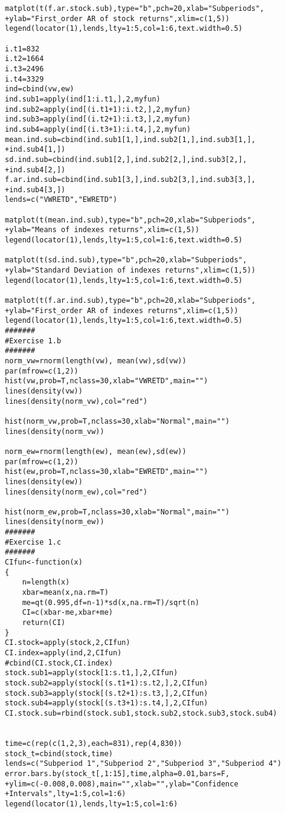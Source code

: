 \begin{small}
\begin{lstlisting}
matplot(t(f.ar.stock.sub),type="b",pch=20,xlab="Subperiods",
+ylab="First_order AR of stock returns",xlim=c(1,5))
legend(locator(1),lends,lty=1:5,col=1:6,text.width=0.5)

i.t1=832
i.t2=1664
i.t3=2496
i.t4=3329
ind=cbind(vw,ew)
ind.sub1=apply(ind[1:i.t1,],2,myfun)
ind.sub2=apply(ind[(i.t1+1):i.t2,],2,myfun)
ind.sub3=apply(ind[(i.t2+1):i.t3,],2,myfun)
ind.sub4=apply(ind[(i.t3+1):i.t4,],2,myfun)
mean.ind.sub=cbind(ind.sub1[1,],ind.sub2[1,],ind.sub3[1,],
+ind.sub4[1,])
sd.ind.sub=cbind(ind.sub1[2,],ind.sub2[2,],ind.sub3[2,],
+ind.sub4[2,])
f.ar.ind.sub=cbind(ind.sub1[3,],ind.sub2[3,],ind.sub3[3,],
+ind.sub4[3,])
lends=c("VWRETD","EWRETD")

matplot(t(mean.ind.sub),type="b",pch=20,xlab="Subperiods",
+ylab="Means of indexes returns",xlim=c(1,5))
legend(locator(1),lends,lty=1:5,col=1:6,text.width=0.5)

matplot(t(sd.ind.sub),type="b",pch=20,xlab="Subperiods",
+ylab="Standard Deviation of indexes returns",xlim=c(1,5))
legend(locator(1),lends,lty=1:5,col=1:6,text.width=0.5)

matplot(t(f.ar.ind.sub),type="b",pch=20,xlab="Subperiods",
+ylab="First_order AR of indexes returns",xlim=c(1,5))
legend(locator(1),lends,lty=1:5,col=1:6,text.width=0.5)
#######
#Exercise 1.b
#######
norm_vw=rnorm(length(vw), mean(vw),sd(vw))
par(mfrow=c(1,2))
hist(vw,prob=T,nclass=30,xlab="VWRETD",main="")
lines(density(vw))
lines(density(norm_vw),col="red")

hist(norm_vw,prob=T,nclass=30,xlab="Normal",main="")
lines(density(norm_vw))

norm_ew=rnorm(length(ew), mean(ew),sd(ew))
par(mfrow=c(1,2))
hist(ew,prob=T,nclass=30,xlab="EWRETD",main="")
lines(density(ew))
lines(density(norm_ew),col="red")

hist(norm_ew,prob=T,nclass=30,xlab="Normal",main="")
lines(density(norm_ew))
#######
#Exercise 1.c
#######
CIfun<-function(x)
{
	n=length(x)
	xbar=mean(x,na.rm=T)
	me=qt(0.995,df=n-1)*sd(x,na.rm=T)/sqrt(n)
	CI=c(xbar-me,xbar+me)
	return(CI)
}
CI.stock=apply(stock,2,CIfun)
CI.index=apply(ind,2,CIfun)
#cbind(CI.stock,CI.index)
stock.sub1=apply(stock[1:s.t1,],2,CIfun)
stock.sub2=apply(stock[(s.t1+1):s.t2,],2,CIfun)
stock.sub3=apply(stock[(s.t2+1):s.t3,],2,CIfun)
stock.sub4=apply(stock[(s.t3+1):s.t4,],2,CIfun)
CI.stock.sub=rbind(stock.sub1,stock.sub2,stock.sub3,stock.sub4)


time=c(rep(c(1,2,3),each=831),rep(4,830))
stock_t=cbind(stock,time)
lends=c("Subperiod 1","Subperiod 2","Subperiod 3","Subperiod 4")
error.bars.by(stock_t[,1:15],time,alpha=0.01,bars=F,
+ylim=c(-0.008,0.008),main="",xlab="",ylab="Confidence
+Intervals",lty=1:5,col=1:6)
legend(locator(1),lends,lty=1:5,col=1:6)


\end{lstlisting}
\end{small}
